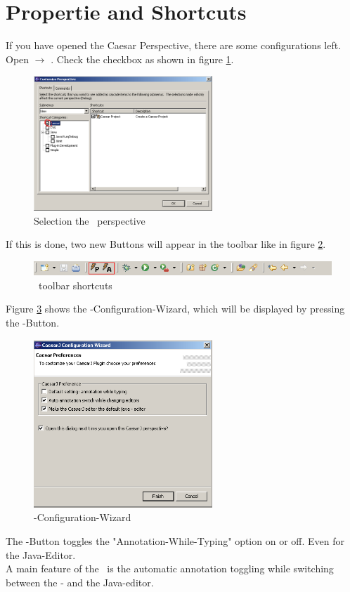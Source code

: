 \section{Propertie and Shortcuts}
If you have opened the Caesar Perspective, there are some configurations left. Open  $\rightarrow$ . Check the  checkbox as shown in figure \ref{fig:propert}.

\begin{figure}[htbp]
	\centering
		\includegraphics[width=0.60\textwidth]{images/propert.png}
	\caption{Selection the \caesarj ~perspective}
	\label{fig:propert}
\end{figure}

If this is done, two new Buttons will appear in the toolbar like in figure \ref{fig:toolbar}.

\begin{figure}[htbp]
	\centering
		\includegraphics[width=1.0\textwidth]{images/toolbar.png}
	\caption{\caesarj ~toolbar shortcuts}
	\label{fig:toolbar}
\end{figure}

Figure \ref{fig:properties} shows the \caesarj -Configuration-Wizard, which will be displayed by pressing the -Button.

\begin{figure}[htbp]
	\centering
		\includegraphics[width=0.60\textwidth]{images/view_properties.png}
	\caption{\caesarj -Configuration-Wizard}
	\label{fig:properties}
\end{figure}

The -Button toggles the "Annotation-While-Typing" option on or off. Even for the Java-Editor.\\
A main feature of the \cjdt ~is the automatic annotation toggling while switching between the \caesarj - and the Java-editor.


